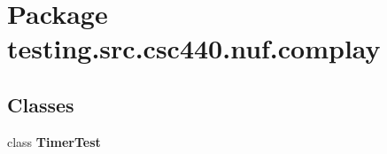 \hypertarget{namespacetesting_1_1src_1_1csc440_1_1nuf_1_1complay}{\section{Package testing.\-src.\-csc440.\-nuf.\-complay}
\label{namespacetesting_1_1src_1_1csc440_1_1nuf_1_1complay}
}
\subsection*{Classes}
\begin{DoxyCompactItemize}
\item 
class {\bfseries Timer\-Test}
\end{DoxyCompactItemize}
